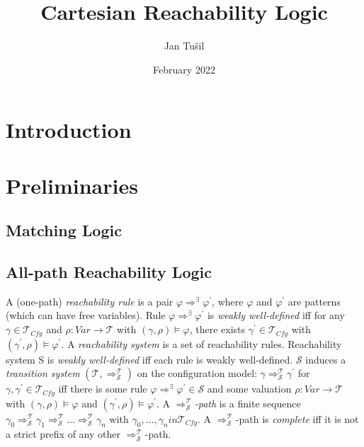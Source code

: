\documentclass{article}
\title{Cartesian Reachability Logic}
\author{Jan Tušil }
\date{February 2022}
\newcommand{\Var}{\mathit{Var}}
\newcommand{\Tcfg}{\mathcal{T}_{\mathit{Cfg}}}
\begin{document}
\maketitle

\section{Introduction}

\section{Preliminaries}

\subsection{Matching Logic}

\subsection{All-path Reachability Logic}

\begin{definition}
A (one-path) \emph{reachability rule} is a pair $\varphi \Rightarrow^\exists \varphi^\prime$,
where $\varphi$ and $\varphi^\prime$
are patterns (which can have free variables).
Rule $\varphi \Rightarrow^\exists \varphi^\prime$ is \emph{weakly well-defined} iff
for any $\gamma \in \Tcfg$ and $\rho : \Var \to \mathcal{T}$ with $(\gamma, \rho) \vDash \varphi$,
there exists $\gamma^\prime \in \Tcfg$ with $(\gamma^\prime , \rho) \vDash \varphi^\prime$.
A \emph{reachability system} is a set of reachability rules.
Reachability system S is \emph{weakly well-defined} iff each rule is weakly well-defined.
$\mathcal{S}$ induces a \emph{transition system}
$(\mathcal{T} , \Rightarrow^{\mathcal{T}}_{\mathcal{S}})$
on the configuration model:
$\gamma \Rightarrow^{\mathcal{T}}_{\mathcal{S}} \gamma^\prime$ for $\gamma, \gamma^\prime \in \Tcfg$
iff there is some rule $\varphi \Rightarrow^\exists \varphi^\prime \in \mathcal{S}$
and some valuation $\rho : \Var \to \mathcal{T}$ with $(\gamma, \rho) \vDash \varphi$
and $(\gamma^\prime , \rho) \vDash \varphi^\prime$.
A \emph{$\Rightarrow^{\mathcal{T}}_{\mathcal{S}}$-path} is a finite
sequence $\gamma_0 \Rightarrow^{\mathcal{T}}_{\mathcal{S}} \gamma_1 \Rightarrow^{\mathcal{T}}_{\mathcal{S}} \ldots \Rightarrow^{\mathcal{T}}_{\mathcal{S}} \gamma_n$
with $\gamma_0,\ldots,\gamma_n in \Tcfg$.
A $\Rightarrow^{\mathcal{T}}_{\mathcal{S}}$-path is \emph{complete} iff it is not a
strict prefix of any other $\Rightarrow^{\mathcal{T}}_{\mathcal{S}}$-path.
\end{definition}
\end{document}
